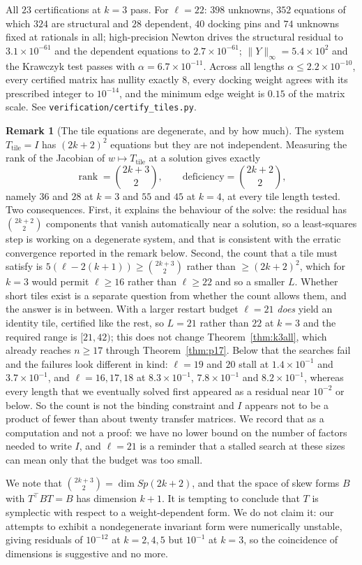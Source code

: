 \documentclass[11pt]{article}
\theoremstyle{definition}
\newtheorem{remark}[theorem]{Remark}
\begin{document}
All $23$ certifications at $k=3$ pass. For $\ell=22$: $398$ unknowns, $352$ equations of
which $324$ are structural and $28$ dependent, $40$ docking pins and $74$
unknowns fixed at rationals in all; high-precision Newton drives the structural
residual to $3.1\times10^{-61}$ and the dependent equations to
$2.7\times10^{-61}$; $\|Y\|_\infty=5.4\times10^{2}$ and the Krawczyk test passes
with $\alpha=6.7\times10^{-11}$. Across all lengths $\alpha\le2.2\times10^{-10}$,
every certified matrix has nullity exactly $8$, every docking weight agrees with
its prescribed integer to $10^{-14}$, and the minimum edge weight is $0.15$ of
the matrix scale. See \texttt{verification/certify\_tiles.py}.

\begin{remark}[The tile equations are degenerate, and by how much]
\label{rem:tilerank}
The system $T_{\text{tile}}=I$ has $(2k+2)^{2}$ equations but they are not
independent. Measuring the rank of the Jacobian of $w\mapsto T_{\text{tile}}$ at
a solution gives exactly
\[
  \operatorname{rank}=\binom{2k+3}{2},\qquad
  \text{deficiency}=\binom{2k+2}{2},
\]
namely $36$ and $28$ at $k=3$ and $55$ and $45$ at $k=4$, at every tile length
tested. Two consequences. First, it explains the behaviour of the solve: the
residual has $\binom{2k+2}2$ components that vanish automatically near a
solution, so a least-squares step is working on a degenerate system, and that is
consistent with the erratic convergence reported in the remark below. Second,
the count that a tile must satisfy is $5(\ell-2(k+1))\ge\binom{2k+3}2$ rather
than $\ge(2k+2)^{2}$, which for $k=3$ would permit $\ell\ge16$ rather than
$\ell\ge22$ and so a smaller $L$. Whether short tiles exist is a separate
question from whether the count allows them, and the answer is in between. With a
larger restart budget $\ell=21$ \emph{does} yield an identity tile, certified
like the rest, so $L=21$ rather than $22$ at $k=3$ and the required range is
$[21,42)$; this does not change Theorem~\ref{thm:k3all}, which already reaches
$n\ge17$ through Theorem~\ref{thm:p17}. Below that the searches fail and the
failures look different in kind: $\ell=19$ and $20$ stall at $1.4\times10^{-1}$
and $3.7\times10^{-1}$, and $\ell=16,17,18$ at $8.3\times10^{-1}$,
$7.8\times10^{-1}$ and $8.2\times10^{-1}$, whereas every length that we
eventually solved first appeared as a residual near $10^{-2}$ or below. So the
count is not the binding constraint and $I$ appears not to be a product of
fewer than about twenty transfer matrices. We record that as a computation and
not a proof: we have no lower bound on the number of factors needed to write
$I$, and $\ell=21$ is a reminder that a stalled search at these sizes can mean
only that the budget was too small.

We note that $\binom{2k+3}2=\dim Sp(2k+2)$, and that the space of skew forms $B$
with $T^{\!\top}BT=B$ has dimension $k+1$. It is tempting to conclude that $T$ is
symplectic with respect to a weight-dependent form. We do not claim it: our
attempts to exhibit a nondegenerate invariant form were numerically unstable,
giving residuals of $10^{-12}$ at $k=2,4,5$ but $10^{-1}$ at $k=3$, so the
coincidence of dimensions is suggestive and no more.
\end{remark}
\end{document}
